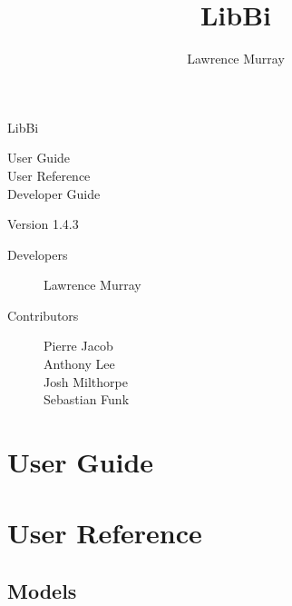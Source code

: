 \documentclass[a4paper,notitlepage]{refrep}
\title{LibBi}
\author{Lawrence Murray}
\date{}
\makeatletter
\newcommand*{\toccontents}{\@starttoc{toc}}
\makeatother
\begin{document}
\pagestyle{empty}

\begin{leftbar}

\vspace{3cm}

\fontsize{72pt}{92pt}\selectfont
LibBi

\vspace{6cm}

\fontsize{24pt}{30pt}\selectfont
User Guide \\
User Reference \\
Developer Guide

\vspace{6cm}

\fontsize{16pt}{24pt}\selectfont
Version 1.4.3

\vspace{1cm}

\end{leftbar}

\newpage
\setcounter{page}{1}
\pagestyle{plain}

{\footnotesize
\begin{description}
\item[Developers]
  Lawrence Murray
\item[Contributors]
  Pierre Jacob \\
  Anthony Lee \\
  Josh Milthorpe \\
  Sebastian Funk
\end{description}
}

\newpage
\toccontents

\newpage
\setcounter{page}{1}

\chapter{User Guide\label{User_Guide}}



\chapter{User Reference\label{User_Reference}}

\section{Models}

\end{document}
